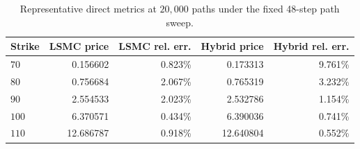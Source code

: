 \begin{table}[htbp]
\centering
\caption{Representative direct metrics at $20{,}000$ paths under the fixed 48-step path sweep.}
\label{tab:bgk_r03_v004_t1_delta05_nex12-path48-path20k}
\begin{tabular}{lrrrr}
\toprule
Strike & LSMC price & LSMC rel. err. & Hybrid price & Hybrid rel. err. \\
\midrule
$70$ & 0.156602 & 0.823\% & 0.173313 & 9.761\% \\
$80$ & 0.756684 & 2.067\% & 0.765319 & 3.232\% \\
$90$ & 2.554533 & 2.023\% & 2.532786 & 1.154\% \\
$100$ & 6.370571 & 0.434\% & 6.390036 & 0.741\% \\
$110$ & 12.686787 & 0.918\% & 12.640804 & 0.552\% \\
\bottomrule
\end{tabular}
\end{table}
